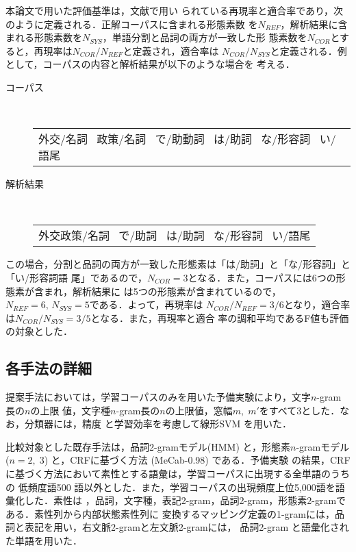 \documentclass[japanese]{jnlp_1.4}
\begin{document}
本論文で用いた評価基準は，文献\cite{EDRコーパスを用いた確率的日本語形態素解析}で用い
られている再現率と適合率であり，次のように定義される．正解コーパスに含まれる形態素数
を$N_{REF}$，解析結果に含まれる形態素数を$N_{SYS}$，単語分割と品詞の両方が一致した形
態素数を$N_{COR}$とすると，再現率は$N_{COR}/N_{REF}$と定義され，適合率は
$N_{COR}/N_{SYS}$と定義される．例として，コーパスの内容と解析結果が以下のような場合を
考える．
\begin{description}

\item[コーパス] \ \\
  \begin{tabular}{l}
    外交/名詞 \ 政策/名詞 \ で/助動詞 \ は/助詞 \ な/形容詞 \ い/語尾
  \end{tabular}

\item[解析結果] \ \\
  \begin{tabular}{l}
    外交政策/名詞 \ で/助詞 \ は/助詞 \ な/形容詞 \ い/語尾
  \end{tabular}

\end{description}
この場合，分割と品詞の両方が一致した形態素は「は/助詞」と「な/形容詞」と「い/形容詞語
尾」であるので，$N_{COR}= 3$となる．また，コーパスには6つの形態素が含まれ，解析結果に
は5つの形態素が含まれているので，$N_ {REF}=6,\,N_{SYS}=5$である．よって，再現率は
$N_{COR}/N_{REF}=3/6$となり，適合率は$N_{COR}/N_{SYS}= 3/5$となる．また，再現率と適合
率の調和平均であるF値も評価の対象とした．



\subsection{各手法の詳細}

提案手法においては，学習コーパスのみを用いた予備実験により，文字$n$-gram長の$n$の上限
値，文字種$n$-gram長の$n$の上限値，窓幅$m,\;m'$をすべて3とした．なお，分類器には，精度
と学習効率を考慮して線形SVM \cite{LIBLINEAR:.A.Library.for.Large.Linear.Classification}
を用いた．

比較対象とした既存手法は，品詞2-gramモデル(HMM) \cite{統計的言語モデルとN-best探索を用
いた日本語形態素解析法}と，形態素$n$-gramモデル($n = 2,\;3$) \cite{形態素クラスタリング
による形態素解析精度の向上}と，CRFに基づく方法
(MeCab-0.98) \cite{Conditional.Random.Fields.を用いた日本語形態素解析}である．予備実験
の結果，CRFに基づく方法において素性とする語彙は，学習コーパスに出現する全単語のうちの
低頻度語500 語以外とした．また，学習コーパスの出現頻度上位5,000語を語彙化した．素性は
，品詞，文字種，表記2-gram，品詞2-gram，形態素2-gramである．素性列から内部状態素性列に
変換するマッピング定義の1-gramには，品詞と表記を用い，右文脈2-gramと左文脈2-gramには，
品詞2-gram と語彙化された単語を用いた．
\end{document}
